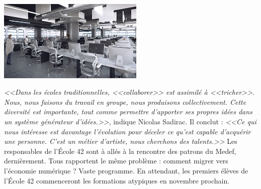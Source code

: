 \documentclass[11pt,twoside,a4paper]{article}
\begin{document}
\begin{minipage}[ht]{7.00cm}
	\includegraphics[width=6.95cm]{img/03-Piscines.png}
\end{minipage} \hfill \begin{minipage}[ht]{0.65\textwidth}
	\emph{<<Dans les {\'e}coles traditionnelles, \emph{<<collaborer>>} est assimil{\'e} {\`a} \emph{<<tricher>>}. Nous, nous faisons du travail en groupe, nous produisons collectivement. Cette diversit{\'e} est importante, tout comme permettre d'apporter ses propres id{\'e}es dans un syst{\`e}me g{\'e}n{\'e}rateur d'id{\'e}es.>>}, indique Nicolas Sadirac. Il conclut : \emph{<<Ce qui nous int{\'e}resse est davantage l'{\'e}volution pour d{\'e}celer ce qu'est capable d'acqu{\'e}rir une personne. C'est un m{\'e}tier d'artiste, nous cherchons des talents.>>} Les responsables de l'{\'E}cole 42 sont {\`a} all{\'e}s {\`a} la rencontre des patrons du Medef, derni{\`e}rement. Tous rapportent le m{\^e}me probl{\`e}me : comment migrer vers l'{\'e}conomie num{\'e}rique ? Vaste programme. En attendant, les premiers {\'e}l{\`e}ves de l'{\'E}cole 42 commenceront les formations atypiques en novembre prochain. %
\end{minipage}~\\~\\
\end{document}
